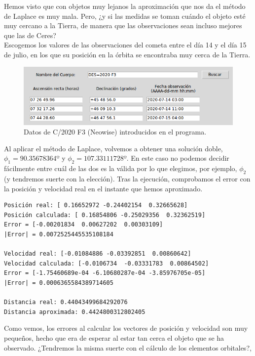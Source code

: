 Hemos visto que con objetos muy lejanos la aproximación que nos da el método de Laplace es muy mala. Pero, ¿y si las medidas se toman cuándo el objeto esté muy cercano a la Tierra, de manera que las observaciones sean incluso mejores que las de Ceres?\\

Escogemos los valores de las observaciones del cometa entre el día 14 y el día 15 de julio, en los que su posición en la órbita se encontraba muy cerca de la Tierra.
\begin{figure}[H]
\centering
\includegraphics[scale=0.5]{images/neowise_exp.png}
\caption{Datos de C/2020 F3 (Neowise) introducidos en el programa.}
\label{fig:neowise_exp}
\end{figure}

Al aplicar el método de Laplace, volvemos a obtener una solución doble, $\phi_1=90.35678364º$ y $\phi_2=107.33111728º$. En este caso no podemos decidir fácilmente entre cuál de las dos es la válida por lo que elegimos, por ejemplo, $\phi_2$ (y tendremos suerte con la elección). Tras la ejecución, comprobamos el error con la posición y velocidad real en el instante que hemos aproximado.
\begin{lstlisting}[style=Console]
Posición real: [ 0.16652972 -0.24402154  0.32665628]
Posición calculada: [ 0.16854806 -0.25029356  0.32362519]
Error = [-0.00201834  0.00627202  0.00303109]
|Error| = 0.0072525445535108184

Velocidad real: [-0.01084886 -0.03392851  0.00860642]
Velocidad calculada: [-0.0106734  -0.03331783  0.00864502]
Error = [-1.75460689e-04 -6.10680287e-04 -3.85976705e-05]
|Error| = 0.0006365584389714605

Distancia real: 0.44043499684292076
Distancia aproximada: 0.4424800312802405
\end{lstlisting}

Como vemos, los errores al calcular los vectores de posición y velocidad son muy pequeños, hecho que era de esperar al estar tan cerca el objeto que se ha observado. ¿Tendremos la misma suerte con el cálculo de los elementos orbitales?,\\

